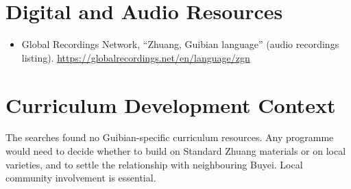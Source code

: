 \documentclass[12pt]{article}
\begin{document}
\section{Digital and Audio Resources}
\begin{itemize}
\item Global Recordings Network, ``Zhuang, Guibian language'' (audio recordings listing). \url{https://globalrecordings.net/en/language/zgn}
\end{itemize}

\section{Curriculum Development Context}
The searches found no Guibian-specific curriculum resources. Any programme would need to decide whether to build on Standard Zhuang materials or on local varieties, and to settle the relationship with neighbouring Buyei. Local community involvement is essential.
\end{document}
